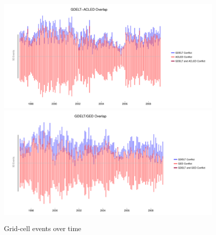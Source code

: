 \documentclass[hidelinks]{article}
\begin{document}
\newpage
\begin{figure}[!htbp]
\includegraphics[width = 1 \textwidth]{timeACLEDAppendixBRestrictive.pdf}\\
\includegraphics[width = 1 \textwidth]{timeGEDAppendixBRestrictive.pdf}
\caption{Grid-cell events over time}\label{fig:correlations_time}
\end{figure}
\end{document}
